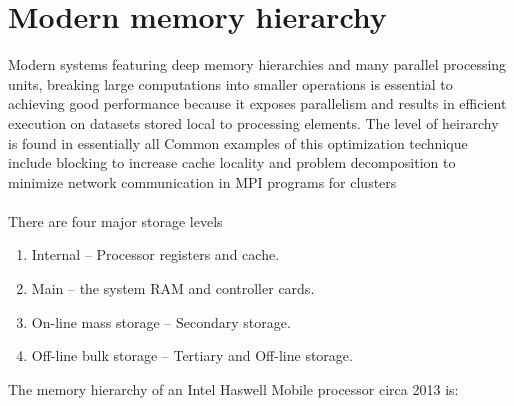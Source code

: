 \documentclass[11pt, conference, onecolumn]{IEEEtran}
\begin{document}
\section{Modern memory hierarchy}
Modern systems featuring deep memory hierarchies and many parallel processing units, breaking large computations into smaller operations is essential to achieving good performance because it exposes parallelism and results in efficient execution on datasets stored local to processing elements. The level of heirarchy is found in  essentially all
 Common examples of this optimization technique include blocking to increase cache locality and problem decomposition to minimize network communication in MPI programs for clusters \\
\\ There are four major storage levels
\begin{enumerate}
  \item Internal – Processor registers and cache.
  \item Main – the system RAM and controller cards.
  \item On-line mass storage – Secondary storage.
  \item Off-line bulk storage – Tertiary and Off-line storage.
\end{enumerate}
The memory hierarchy of an Intel Haswell Mobile processor circa 2013 is:
\end{document}
